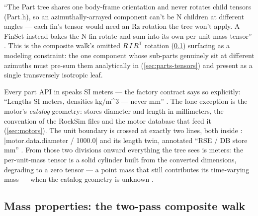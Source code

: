 \begin{designrule}
``The Part tree shares one body-frame orientation and never rotates child tensors (Part.h), so
an azimuthally-arrayed component can't be N children at different angles --- each fin's tensor
would need an Rz rotation the tree won't apply. A FinSet instead bakes the N-fin
rotate-and-sum into its own per-unit-mass tensor'' . This is the
composite walk's omitted $R\,I\,R^{\mathsf{T}}$ rotation (\cref{sec:parts-massprops}) surfacing
as a modeling constraint: the one component whose sub-parts genuinely sit at different
azimuths must pre-sum them analytically in 
(\cref{sec:parts-tensors}) and present as a single transversely isotropic leaf.
\end{designrule}

\begin{keyinsight}
Every part API in  speaks SI meters --- the factory contract says so
explicitly: ``Lengths SI meters, densities kg/m\textasciicircum{}3 --- never mm''
. The lone exception is the motor's \emph{catalog}
geometry:  stores diameter and length in millimeters, the convention of the
RockSim files and the motor database that feed it (\cref{sec:motors}). The unit boundary is
crossed at exactly two lines, both inside :
\cppinline|motor.data.diameter / 1000.0| and its length twin, annotated ``RSE / DB store mm''
. From those two divisions onward everything the tree sees is
meters: the per-unit-mass tensor is a solid cylinder built from the converted dimensions,
degrading to a zero tensor --- a point mass that still contributes its time-varying mass ---
when the catalog geometry is unknown .
\end{keyinsight}

\subsection{Mass properties: the two-pass composite walk}\label{sec:parts-massprops}

